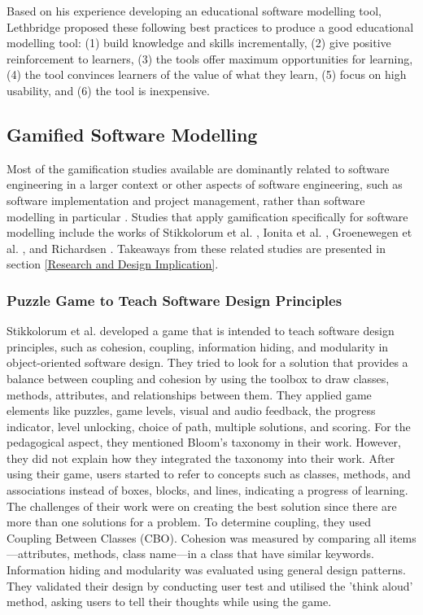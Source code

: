 \documentclass[12pt, a4paper]{report}
\begin{document}
{Based on his experience developing an educational software modelling tool, Lethbridge \cite{lethbridge2014teaching} proposed these following best practices to produce  a good educational modelling tool: (1) build knowledge and skills incrementally, (2) give positive reinforcement to learners, (3) the tools offer maximum opportunities for learning, (4) the tool convinces learners of the value of what they learn, (5) focus on high usability, and (6) the tool is inexpensive.

\subsection{Gamified Software Modelling}
\label{Gamified Software Modelling}
Most of the gamification studies available are dominantly related to software engineering in a larger context or other aspects of software engineering, such as software implementation and project management, rather than software modelling in particular \cite{Pedreira2015}. Studies that apply gamification specifically for software modelling include the works of Stikkolorum et al. \cite{Stikkolorum2014}, Ionita et al. \cite{Ionita2015}, Groenewegen et al. \cite{Groenewegen2010}, and Richardsen \cite{Richardsen2014}. Takeaways from these related studies are presented in section \ref{Research and Design Implication}.

\subsubsection{Puzzle Game to Teach Software Design Principles}
Stikkolorum et al. \cite{Stikkolorum2014} developed a game that is intended to teach software design principles, such as cohesion, coupling, information hiding, and modularity in object-oriented software design. They tried to look for a solution that provides a balance between coupling and cohesion by using the toolbox to draw classes, methods, attributes, and relationships between them. They applied game elements like puzzles, game levels, visual and audio feedback, the progress indicator, level unlocking, choice of path, multiple solutions, and scoring. For the pedagogical aspect, they mentioned Bloom’s taxonomy in their work. However, they did not explain how they integrated the taxonomy into their work. After using their game, users started to refer to concepts such as classes, methods, and associations instead of boxes, blocks, and lines, indicating a progress of learning. The challenges of their work were on creating the best solution since there are more than one solutions for a problem. To determine coupling, they used Coupling Between Classes (CBO). Cohesion was measured by comparing all items---attributes, methods, class name---in a class that have similar keywords. Information hiding and modularity was evaluated using general design patterns. They validated their design by conducting user test and utilised the 'think aloud' method, asking users to tell their thoughts while using the game. 


}
\end{document}
